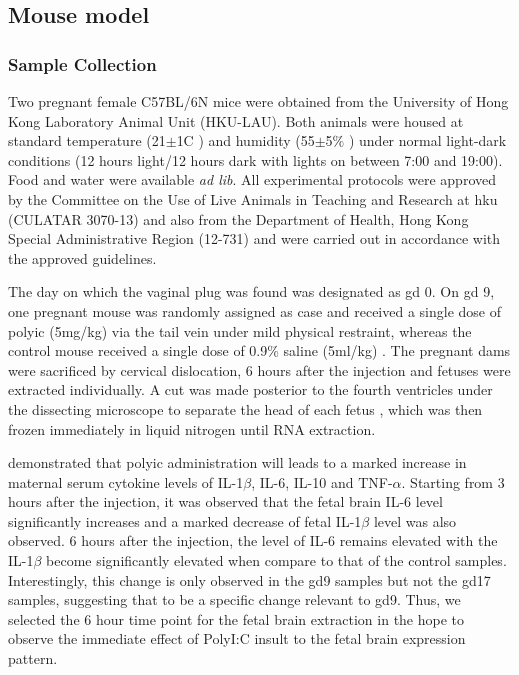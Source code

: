 %

\subsection{Mouse model}
\subsubsection{Sample Collection}
Two pregnant female C57BL/6N mice were obtained from the University of Hong Kong Laboratory Animal Unit (HKU-LAU).
Both animals were housed at standard temperature (21$\pm$1\degree C ) and humidity (55$\pm$5$\%$ ) under normal light-dark conditions (12 hours light/12 hours dark with lights on between 7:00 and 19:00).
Food and water were available \textit{ad lib}.
All experimental protocols were approved by the Committee on the Use of Live Animals in Teaching and Research at \gls{hku} (CULATAR 3070-13) and also from the Department of Health, Hong Kong Special Administrative Region (12-731) and were carried out in accordance with the approved guidelines. 

The day on which the vaginal plug was found was designated as \gls{gd} 0.
On \gls{gd} 9, one pregnant mouse was randomly assigned as case and received a single dose of \gls{polyic} (5mg/kg) via the tail vein under mild physical restraint, whereas the control mouse received a single dose of 0.9$\%$ saline (5ml/kg) \citep{Li2009c}.
The pregnant dams were sacrificed by cervical dislocation, 6 hours after the injection and fetuses were extracted individually.
A cut was made posterior to the fourth ventricles under the dissecting microscope to separate the head of each fetus \citep{Kaufman1992}, which was then frozen immediately in liquid nitrogen until RNA extraction. 


\citet{Meyer2006b} demonstrated that \gls{polyic} administration will leads to a marked increase in maternal serum cytokine levels of IL-1$\beta$, IL-6, IL-10 and TNF-$\alpha$.
Starting from 3 hours after the injection, it was observed that the fetal brain IL-6 level significantly increases and a marked decrease of fetal IL-1$\beta$ level was also observed. 
6 hours after the injection, the level of IL-6 remains elevated with the IL-1$\beta$ become significantly elevated when compare to that of the control samples.
Interestingly, this change is only observed in the \gls{gd}9 samples but not the \gls{gd}17 samples, suggesting that to be a specific change relevant to \gls{gd}9.
Thus, we selected the 6 hour time point for the fetal brain extraction in the hope to observe the immediate effect of PolyI:C insult to the fetal brain expression pattern.


